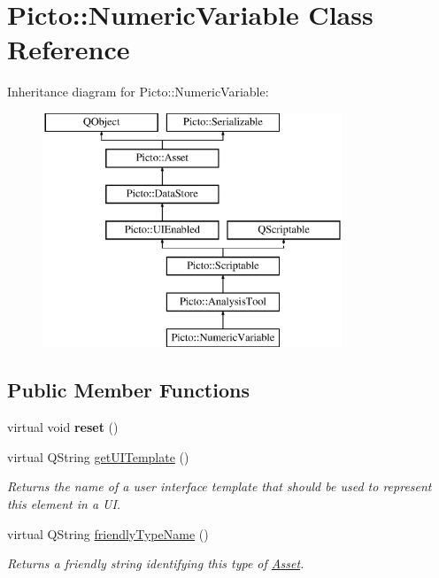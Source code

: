 \hypertarget{class_picto_1_1_numeric_variable}{\section{Picto\-:\-:Numeric\-Variable Class Reference}
\label{class_picto_1_1_numeric_variable}
}
Inheritance diagram for Picto\-:\-:Numeric\-Variable\-:\begin{figure}[H]
\begin{center}
\leavevmode
\includegraphics[height=7.000000cm]{class_picto_1_1_numeric_variable}
\end{center}
\end{figure}
\subsection*{Public Member Functions}
\begin{DoxyCompactItemize}
\item 
\hypertarget{class_picto_1_1_numeric_variable_a289347fab797285c3b1f9bf3cf4f5502}{virtual void {\bfseries reset} ()}\label{class_picto_1_1_numeric_variable_a289347fab797285c3b1f9bf3cf4f5502}

\item 
\hypertarget{class_picto_1_1_numeric_variable_a1fde1042f4d3a95e51cecdb1a02f8e54}{virtual Q\-String \hyperlink{class_picto_1_1_numeric_variable_a1fde1042f4d3a95e51cecdb1a02f8e54}{get\-U\-I\-Template} ()}\label{class_picto_1_1_numeric_variable_a1fde1042f4d3a95e51cecdb1a02f8e54}

\begin{DoxyCompactList}\small\item\em Returns the name of a user interface template that should be used to represent this element in a U\-I. \end{DoxyCompactList}\item 
virtual Q\-String \hyperlink{class_picto_1_1_numeric_variable_a1fa66100606d136122d41a065fdf14d8}{friendly\-Type\-Name} ()
\begin{DoxyCompactList}\small\item\em Returns a friendly string identifying this type of \hyperlink{class_picto_1_1_asset}{Asset}. \end{DoxyCompactList}\end{DoxyCompactItemize}
